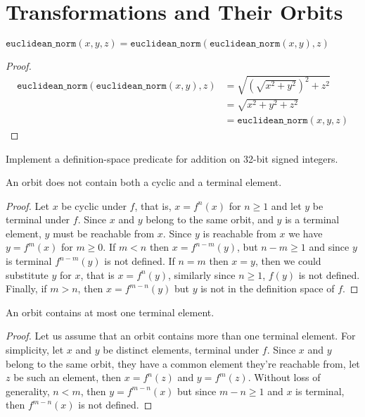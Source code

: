 
\chapter{Transformations and Their Orbits}

\begin{lemma}
	$\mathtt{euclidean\_norm}(x, y, z) = \mathtt{euclidean\_norm}(\mathtt{euclidean\_norm}(x, y), z)$
\end{lemma}

\begin{proof}
	\begin{align*}
		\mathtt{euclidean\_norm}(\mathtt{euclidean\_norm}(x, y), z)
		&= \sqrt{\left (\sqrt{x^2 + y^2} \right )^2 + z^2}\\
		&= \sqrt{x^2 + y^2 + z^2}\\
		&= \mathtt{euclidean\_norm}(x, y, z)
	\end{align*}
\end{proof}

\begin{exercise}
	Implement a definition-space predicate for addition on 32-bit signed integers.
\end{exercise}



\begin{lemma}
	An orbit does not contain both a cyclic and a terminal element.
\end{lemma}

\begin{proof}
	Let $x$ be cyclic under $f$, that is, $x = f^n(x)$ for $n \geq 1$ and let $y$ be
	terminal under $f$. Since $x$ and $y$ belong to the same orbit, and $y$ is a
	terminal element, $y$ must be reachable from $x$. Since $y$ is reachable from $x$
	we have $y = f^m(x)$ for $m \geq 0$. If $m < n$ then $x = f^{n - m}(y)$, but
	$n - m \geq 1$ and since $y$ is terminal $f^{n - m}(y)$ is not defined. If $n = m$
	then $x = y$, then we could substitute $y$ for $x$, that is $x = f^n(y)$, similarly
	since $n \geq 1$, $f(y)$ is not defined. Finally, if $m > n$, then $x = f^{m - n}(y)$
	but $y$ is not in the definition space of $f$.
\end{proof}

\begin{lemma}
	An orbit contains at most one terminal element.
\end{lemma}

\begin{proof}
	Let us assume that an orbit contains more than one terminal element. For simplicity,
	let $x$ and $y$ be distinct elements, terminal under $f$. Since $x$ and $y$ belong
	to the same orbit, they have a common element they're reachable from, let $z$ be
	such an element, then $x = f^n(z)$ and $y = f^m(z)$. Without loss of generality,
	$n < m$, then $y = f^{m - n}(x)$ but since $m - n \geq 1$ and $x$ is terminal, then
	$f^{m - n}(x)$ is not defined.
\end{proof}

